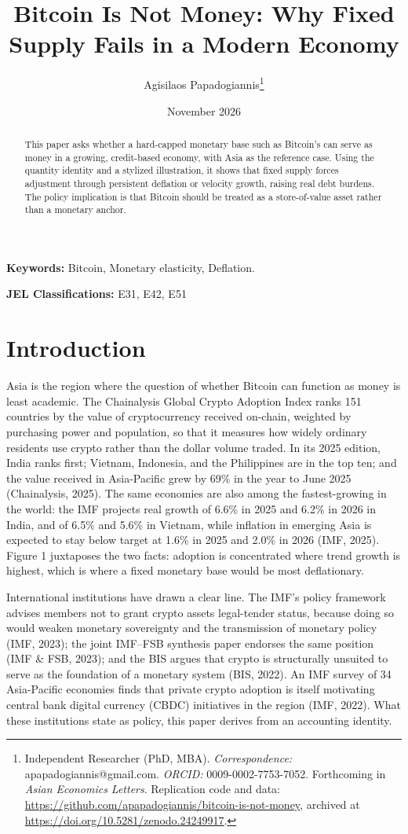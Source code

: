\documentclass[12pt]{article}
\title{Bitcoin Is Not Money: Why Fixed Supply Fails in a Modern Economy}
\author{Agisilaos Papadogiannis\thanks{Independent Researcher (PhD, MBA). \textit{Correspondence:} apapadogiannis@gmail.com. \textit{ORCID:} 0009-0002-7753-7052. Forthcoming in \textit{Asian Economics Letters}. Replication code and data: \url{https://github.com/apapadogiannis/bitcoin-is-not-money}, archived at \url{https://doi.org/10.5281/zenodo.24249917}.}}
\date{November 2026}
\begin{document}
\maketitle

\begin{abstract}
\noindent This paper asks whether a hard-capped monetary base such as Bitcoin's can serve as money in a growing, credit-based economy, with Asia as the reference case. Using the quantity identity and a stylized illustration, it shows that fixed supply forces adjustment through persistent deflation or velocity growth, raising real debt burdens. The policy implication is that Bitcoin should be treated as a store-of-value asset rather than a monetary anchor.
\end{abstract}

\noindent\textbf{Keywords:} Bitcoin, Monetary elasticity, Deflation.

\noindent\textbf{JEL Classifications:} E31, E42, E51

\section{Introduction}

Asia is the region where the question of whether Bitcoin can function as money is least academic. The Chainalysis Global Crypto Adoption Index ranks 151 countries by the value of cryptocurrency received on-chain, weighted by purchasing power and population, so that it measures how widely ordinary residents use crypto rather than the dollar volume traded. In its 2025 edition, India ranks first; Vietnam, Indonesia, and the Philippines are in the top ten; and the value received in Asia-Pacific grew by 69\% in the year to June 2025 (Chainalysis, 2025). The same economies are also among the fastest-growing in the world: the IMF projects real growth of 6.6\% in 2025 and 6.2\% in 2026 in India, and of 6.5\% and 5.6\% in Vietnam, while inflation in emerging Asia is expected to stay below target at 1.6\% in 2025 and 2.0\% in 2026 (IMF, 2025). Figure 1 juxtaposes the two facts: adoption is concentrated where trend growth is highest, which is where a fixed monetary base would be most deflationary.

International institutions have drawn a clear line. The IMF's policy framework advises members not to grant crypto assets legal-tender status, because doing so would weaken monetary sovereignty and the transmission of monetary policy (IMF, 2023); the joint IMF--FSB synthesis paper endorses the same position (IMF \& FSB, 2023); and the BIS argues that crypto is structurally unsuited to serve as the foundation of a monetary system (BIS, 2022). An IMF survey of 34 Asia-Pacific economies finds that private crypto adoption is itself motivating central bank digital currency (CBDC) initiatives in the region (IMF, 2022). What these institutions state as policy, this paper derives from an accounting identity.
\end{document}
